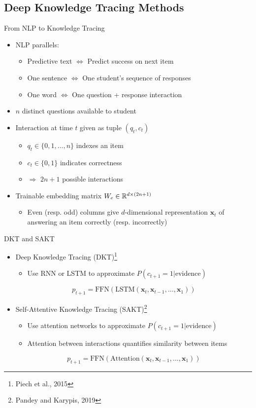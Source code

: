 \documentclass{beamer}
\def \R{\ensuremath \mathbb{R}}
\newcommand{\vect}[1]{\boldsymbol{#1}}
\theoremstyle{definition}
\begin{document}
\subsection{Deep Knowledge Tracing Methods}
\begin{frame}{From NLP to Knowledge Tracing}
  \begin{itemize}
    \item NLP parallels:
      \begin{itemize}
        \item Predictive text $\iff$ Predict success on next item
        \item One sentence $\iff$ One student's sequence of responses
        \item One word $\iff$ One question + response interaction
      \end{itemize}
    \item<2-> $n$ distinct questions available to student
    \item<2-> Interaction at time $t$ given as tuple $(q_t, c_t)$
      \begin{itemize}
        \item $q_t \in \{0,1,\ldots,n\}$ indexes an item
        \item $c_t \in \{0,1\}$ indicates correctness
        \item $\Rightarrow$ $2n+1$ possible interactions
      \end{itemize}
    \item<3-> Trainable embedding matrix $W_e \in \R^{d \times (2n+1)}$
      \begin{itemize}
        \item Even (resp. odd) columns give $d$-dimensional representation $\vect x_t$ of answering an item correctly (resp. incorrectly)
      \end{itemize}
  \end{itemize}
\end{frame}

\begin{frame}{DKT and SAKT}
  \begin{itemize}
    \item Deep Knowledge Tracing (DKT)\footnote{Piech et al., 2015}
      \begin{itemize}
        \item Use RNN or LSTM to approximate $P(c_{t+1} = 1 | \text{evidence})$
      \end{itemize}
          \[p_{t+1} = \text{FFN}(\text{LSTM}(\vect x_t, \vect x_{t-1},\ldots,\vect x_1))\]
          \smallskip
    \item<2-> Self-Attentive Knowledge Tracing (SAKT)\footnote{Pandey and Karypis, 2019}
      \begin{itemize}
        \item Use attention networks to approximate $P(c_{t+1} = 1 | \text{evidence})$
        \item Attention between interactions quantifies similarity between items
      \end{itemize}
          \[p_{t+1} = \text{FFN}(\text{Attention}(\vect x_t, \vect x_{t-1}, \ldots, \vect x_1))\]
  \end{itemize}
\end{frame}
\end{document}
